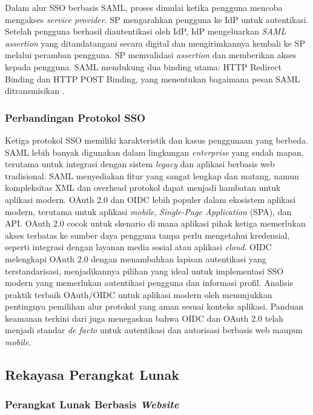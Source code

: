 Dalam alur SSO berbasis SAML, proses dimulai ketika pengguna mencoba mengakses \textit{service provider}. SP mengarahkan pengguna ke IdP untuk autentikasi. Setelah pengguna berhasil diautentikasi oleh IdP, IdP mengeluarkan \textit{SAML assertion} yang ditandatangani secara digital dan mengirimkannya kembali ke SP melalui peramban pengguna. SP memvalidasi \textit{assertion} dan memberikan akses kepada pengguna. SAML mendukung dua binding utama: HTTP Redirect Binding dan HTTP POST Binding, yang menentukan bagaimana pesan SAML ditransmisikan \citep{Mainka_2017_SoK_OpenIDConnect}.

\subsubsection{Perbandingan Protokol SSO}

Ketiga protokol SSO memiliki karakteristik dan kasus penggunaan yang berbeda. SAML lebih banyak digunakan dalam lingkungan \textit{enterprise} yang sudah mapan, terutama untuk integrasi dengan sistem \textit{legacy} dan aplikasi berbasis web tradisional. SAML menyediakan fitur yang sangat lengkap dan matang, namun kompleksitas XML dan overhead protokol dapat menjadi hambatan untuk aplikasi modern. OAuth 2.0 dan OIDC lebih populer dalam ekosistem aplikasi modern, terutama untuk aplikasi \textit{mobile}, \textit{Single-Page Application} (SPA), dan API. OAuth 2.0 cocok untuk skenario di mana aplikasi pihak ketiga memerlukan akses terbatas ke sumber daya pengguna tanpa perlu mengetahui kredensial, seperti integrasi dengan layanan media sosial atau aplikasi \textit{cloud}. OIDC melengkapi OAuth 2.0 dengan menambahkan lapisan autentikasi yang terstandarisasi, menjadikannya pilihan yang ideal untuk implementasi SSO modern yang memerlukan autentikasi pengguna dan informasi profil. Analisis praktik terbaik OAuth/OIDC untuk aplikasi modern oleh \citet{Sharif_2022_OAuthOIDCNativeBCP} menunjukkan pentingnya pemilihan alur protokol yang aman sesuai konteks aplikasi. Panduan keamanan terkini dari \citet{Lodderstedt_2025_OAuth2SecurityBCP} juga menegaskan bahwa OIDC dan OAuth 2.0 telah menjadi standar \textit{de facto} untuk autentikasi dan autorisasi berbasis web maupun \textit{mobile}.

\subsection{Rekayasa Perangkat Lunak}

\subsubsection{Perangkat Lunak Berbasis \textit{Website}}

